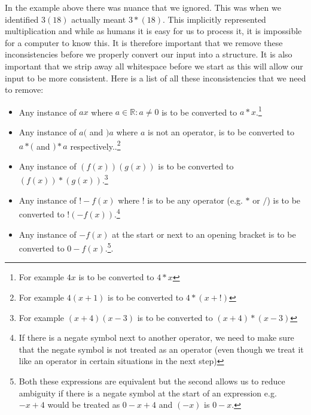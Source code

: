 \documentclass[../../../../../main.tex]{subfiles}
\begin{document}
In the example above there was nuance that we ignored. This was when we identified $3(18)$ actually meant $3 * (18)$. This implicitly represented multiplication and while as humans it is easy for us to process it, it is impossible for a computer to know this. It is therefore important that we remove these inconsistencies before we properly convert our input into a structure. It is also important that we strip away all whitespace before we start as this will allow our input to be more consistent. Here is a list of all these inconsistencies that we need to remove:
\begin{itemize}
	\item Any instance of $ax$ where $a \in  \mathbb{R} : a \neq 0$ is to be converted to $a*x$.\footnote{For example $4x$ is to be converted to $4*x$}
	\item Any instance of $a($ and $)a$ where $a$ is not an operator, is to be converted to $a*($ and $)*a$ respectively..\footnote{For example $4(x+1)$ is to be converted to $4*(x+!)$}
	\item Any instance of $(f(x))(g(x))$ is to be converted to $(f(x))*(g(x))$.\footnote{For example $(x+4)(x-3)$ is to be converted to $(x+4)*(x-3)$}
	\item Any instance of $!-f(x)$ where $!$ is to be any operator (e.g. $*$ or $/$) is to be converted to $! (-f(x))$.\footnote{If there is a negate symbol next to another operator, we need to make sure that the negate symbol is not treated as an operator (even though we treat it like an operator in certain situations in the next step)}
	\item Any instance of $-f(x)$ at the start or next to an opening bracket is to be converted to $0 - f(x)$.\footnote{Both these expressions are equivalent but the second allows us to reduce ambiguity if there is a negate symbol at the start of an expression e.g.\ $-x + 4$ would be treated as $0 - x + 4$ and $(-x)$ is $0-x$.}.
\end{itemize}
\newpage
\end{document}
